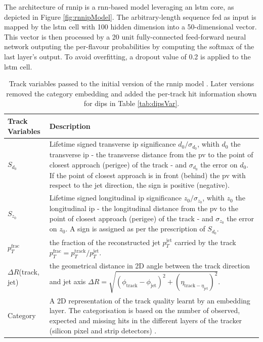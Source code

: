 The architecture of \gls{rnnip} is a \gls{rnn}-based model leveraging an \gls{lstm} core, as depicted in Figure \ref{fig:rnnipModel}. The arbitrary-length sequence fed as input is mapped by the \gls{lstm} cell with 100 hidden dimension into a 50-dimensional vector. This vector is then processed by a 20 unit fully-connected feed-forward neural network outputing the per-flavour probabilities by computing the softmax of the last layer's output. To avoid overfitting, a dropout value of 0.2 is applied to the \gls{lstm} cell. 

\begin{table}[h]
  \begin{center}
      \begin{tabular}{C{3cm}|C{13cm}} 
      	 \hline \hline
          Track Variables & Description  \\ \hline \hline
          $S_{d_0}$      & Lifetime signed transverse \gls{ip} significance $d_0 / \sigma_{d_0}$, whith $d_0$ the transverse \gls{ip} - the transverse distance from the \gls{pv} to the point of closest approach (perigee) of the track - and $\sigma_{d_0}$ the error on $d_0$. If the point of closest approach is in front (behind) the \gls{pv} with respect to the jet direction, the sign is positive (negative). \\ \hline
          $S_{z_0}$      & Lifetime signed longitudinal \gls{ip} significance $z_0 / \sigma_{z_0}$, whith $z_0$ the longitudinal \gls{ip} - the longitudinal distance from the \gls{pv} to the point of closest approach (perigee) of the track - and $\sigma_{z_0}$ the error on $z_0$. A sign is assigned as per the prescription of $S_{d_0}$. \\ \hline
          $p_T^{\textrm{frac}}$   & the fraction of the reconstructed jet $p_T^{\textrm{jet}}$ carried by the track $p_T^{\textrm{frac}} = p_T^{\textrm{track}} / p_T^{\textrm{jet}}$. \\ \hline
          $\Delta R$(track, jet) & the geometrical distance in 2D angle between the track direction and jet axis $\Delta R = \sqrt{(\phi_{\textrm{track}} - \phi_{\textrm{jet}})^2 + (\eta_{\textrm{track} - \eta_{\textrm{jet}}})^2}$. \\ \hline
          Category       & A 2D representation of the track quality learnt by an embedding layer. The categorisation is based on the number of observed, expected and missing hits in the different layers of the tracker (silicon pixel and strip detectors) \cite{ATL-PHYS-PUB-2015-022}.  \\ \hline
      \end{tabular}
    \caption{Track variables passed to the initial version of the \gls{rnnip} model \cite{ATL-PHYS-PUB-2017-003}. Later versions removed the category embedding and added the per-track hit information shown for \gls{dips} in Table \ref{tab:dipsVar}.}
    \label{tab:rnnipVar}
  \end{center}
\end{table}

